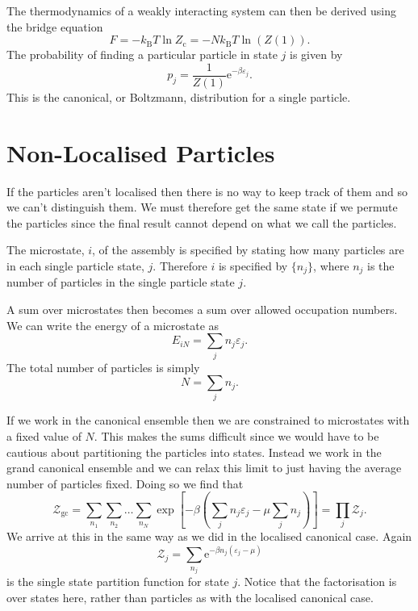 \documentclass[fleqn]{NotesClass}
\newcommand*{\boltzmann}{k_{\mathrm{B}}}
\newcommand*{\cpartition}{Z_{\mathrm{c}}}
\newcommand*{\gcpartition}{\mathcal{Z}_{\mathrm{gc}}}
\newcommand*{\e}{\mathrm{e}}
\begin{document}
    The thermodynamics of a weakly interacting system can then be derived using the bridge equation
    \begin{equation}
        F = -\boltzmann T \ln \cpartition = -N\boltzmann T \ln(Z(1)).
    \end{equation}
    The probability of finding a particular particle in state \(j\) is given by
    \begin{equation}
        p_j = \frac{1}{Z(1)}\e^{-\beta \varepsilon_j}.
    \end{equation}
    This is the canonical, or Boltzmann, distribution for a single particle.
    
    \section{Non-Localised Particles}
    If the particles aren't localised then there is no way to keep track of them and so we can't distinguish them.
    We must therefore get the same state if we permute the particles since the final result cannot depend on what we call the particles.
    
    The microstate, \(i\), of the assembly is specified by stating how many particles are in each single particle state, \(j\).
    Therefore \(i\) is specified by \(\{n_j\}\), where \(n_j\) is the number of particles in the single particle state \(j\).
    
    A sum over microstates then becomes a sum over allowed occupation numbers.
    We can write the energy of a microstate as
    \begin{equation}
        E_{iN} = \sum_j n_j\varepsilon_j.
    \end{equation}
    The total number of particles is simply
    \begin{equation}
        N = \sum_{j} n_j.
    \end{equation}
    
    If we work in the canonical ensemble then we are constrained to microstates with a fixed value of \(N\).
    This makes the sums difficult since we would have to be cautious about partitioning the particles into states.
    Instead we work in the grand canonical ensemble and we can relax this limit to just having the average number of particles fixed.
    Doing so we find that
    \begin{equation}
        \gcpartition = \sum_{n_1}\sum_{n_2} \dotso \sum_{n_N} \exp\left[ -\beta\left( \sum_{j} n_j\varepsilon_j - \mu\sum_{j} n_j \right) \right] = \prod_j \mathcal{Z}_j.
    \end{equation}
    We arrive at this in the same way as we did in the localised canonical case.
    Again
    \begin{equation}
        \mathcal{Z}_j = \sum_{n_j} \e^{-\beta n_j(\varepsilon_j - \mu)}
    \end{equation}
    is the single state partition function for state \(j\).
    Notice that the factorisation is over states here, rather than particles as with the localised canonical case.
    
\end{document}
